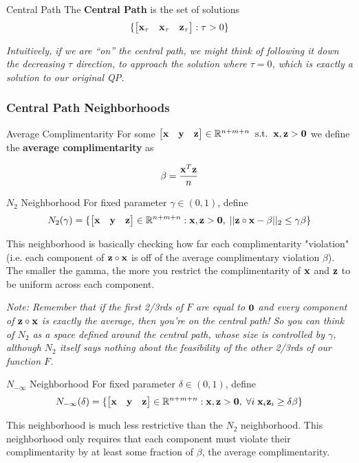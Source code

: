 \begin{defn}{Central Path}{}
The \textbf{Central Path} is the set of solutions
\[\{\begin{bmatrix} \mathbf{x}_\tau & \mathbf{x}_\tau & \mathbf{z}_\tau \end{bmatrix} : \tau > 0\}\] 

\textit{Intuitively, if we are ``on'' the central path, we might 
think of following it down the decreasing $\tau$ direction, to approach the 
solution where $\tau = 0$, which is exactly a solution to our original QP.}
\end{defn}

\subsubsection{Central Path Neighborhoods}

\begin{defn}{Average Complimentarity}{}
For some $\begin{bmatrix} \mathbf{x} & \mathbf{y} & \mathbf{z} \end{bmatrix} \in \mathbb{R}^{n+m+n} \;\; \text{s.t.} \;\;
\mathbf{x}, \mathbf{z} > \mathbf{0}$ we define the \textbf{average complimentarity} as 
	
$$\beta = \frac{\mathbf{x}^T\mathbf{z}}{n}$$
\end{defn}

\begin{defn}{$N_2$ Neighborhood}{}
For fixed parameter $\gamma \in (0,1)$, define 
$$N_2(\gamma)
= 
\{ \begin{bmatrix} \mathbf{x} & \mathbf{y} & \mathbf{z} \end{bmatrix} \in \mathbb{R}^{n+m+n} : \mathbf{x},\mathbf{z} > \mathbf{0}, \; ||\mathbf{z} \circ \mathbf{x} - \beta||_2
\leq \gamma\beta\}$$ 
\end{defn}
This neighborhood is basically checking how far each 
complimentarity "violation" (i.e. each component of $\mathbf{z} \circ \mathbf{x}$ is off of 
the average complimentary violation $\beta$). The smaller the gamma, the
more you restrict the complimentarity of $\mathbf{x}$ and $\mathbf{z}$ to be uniform
across each component.

\textit{Note: Remember that if the first 2/3rds
of $F$ are equal to $\mathbf{0}$ and every component of $\mathbf{z} \circ \mathbf{x}$ is exactly
the average, then \textit{you're on the central path}! 
So you can think of 
$N_2$ as a space defined around the central path, whose size is controlled by 
$\gamma$, although $N_2$ itself says nothing about the feasibility of the
other 2/3rds of our function $F$.}

\begin{defn}{$N_{-\infty}$ Neighborhood}{}
For fixed parameter $\delta \in (0,1)$, define 
$$N_{-\infty}(\delta) = 
	\{ \begin{bmatrix} \mathbf{x} & \mathbf{y} & \mathbf{z} \end{bmatrix} \in \mathbb{R}^{n+m+n} : \mathbf{x},\mathbf{z} > \mathbf{0}, \;
	\forall i \; \mathbf{x}_i\mathbf{z}_i \geq \delta\beta \}$$ 
\end{defn}

This neighborhood is much less restrictive
than the $N_2$ neighborhood. This neighborhood only requires that each component
must violate their complimentarity by at least some fraction of $\beta$, the
average complimentarity. 

